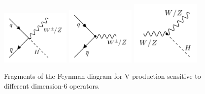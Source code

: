 \documentclass[a4paper,11pt]{article}
\newcommand{\Pb}{{{\Pqb}}\xspace}
\newcommand{\PAb}{{{{\Paqb}}}\xspace}
\renewcommand{\PV}{{{{V}}}\xspace}
\newcommand{\VH}{{{\PV}{\PH}}\xspace}
\begin{document}
\begin{figure}[hbtp]
\begin{center}
\includegraphics[width=0.3\textwidth]{Figures/Feynman_diagrams/ffVh.png}
\includegraphics[width=0.3\textwidth]{Figures/Feynman_diagrams/Vff.png}
\includegraphics[width=0.3\textwidth]{Figures/Feynman_diagrams/hVV.png}
\end{center}
\caption{
Fragments of the Feynman diagram for \VH production sensitive to different dimension-6 operators.
}
\label{fig:Feynman_digarams}
\end{figure}


\end{document}
